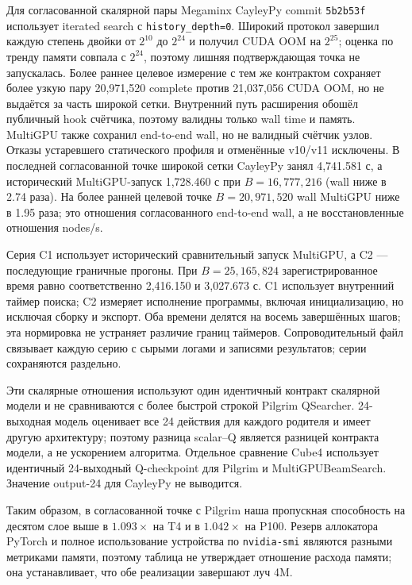 \documentclass[10pt,twocolumn]{article}
\begin{document}
Для согласованной скалярной пары Megaminx CayleyPy commit \texttt{5b2b53f}
использует iterated search с \texttt{history\_depth=0}. Широкий протокол
завершил каждую степень двойки от $2^{10}$ до $2^{24}$ и получил CUDA OOM на
$2^{25}$; оценка по тренду памяти совпала с $2^{24}$, поэтому лишняя
подтверждающая точка не запускалась. Более раннее целевое измерение с тем же
контрактом сохраняет более узкую пару 20,971,520 complete против 21,037,056
CUDA OOM, но не выдаётся за часть широкой сетки. Внутренний путь
расширения обошёл публичный hook счётчика, поэтому валидны только wall time и
память. MultiGPU также сохранил end-to-end wall, но не валидный счётчик узлов.
Отказы устаревшего статического профиля и отменённые v10/v11 исключены. В
последней согласованной
точке широкой сетки CayleyPy занял 4,741.581 с, а исторический MultiGPU-запуск
1,728.460 с при $B=16{,}777{,}216$ (wall ниже в 2.74 раза). На более ранней
целевой точке $B=20{,}971{,}520$ wall MultiGPU ниже в 1.95 раза; это отношения
согласованного end-to-end wall, а не восстановленные отношения nodes/s.

Серия C1 использует исторический сравнительный запуск MultiGPU, а C2 ---
последующие граничные прогоны. При $B=25{,}165{,}824$ зарегистрированное время равно
соответственно 2,416.150 и 3,027.673 с. C1 использует внутренний таймер поиска;
C2 измеряет исполнение программы, включая инициализацию, но исключая сборку и экспорт.
Оба времени делятся на восемь завершённых шагов; эта нормировка не устраняет различие границ таймеров.
Сопроводительный файл
 связывает каждую серию с сырыми логами
и записями результатов; серии сохраняются раздельно.

Эти скалярные отношения используют один идентичный контракт скалярной модели и
не сравниваются с более быстрой строкой Pilgrim QSearcher. 24-выходная модель
оценивает все 24 действия для каждого родителя и имеет другую архитектуру;
поэтому разница scalar--Q является разницей контракта модели, а не ускорением
алгоритма. Отдельное сравнение Cube4 использует идентичный 24-выходный
Q-checkpoint для Pilgrim и MultiGPUBeamSearch. Значение output-24 для CayleyPy
не выводится.

Таким образом, в согласованной
точке с Pilgrim наша пропускная способность на
десятом слое выше в $1.093\times$ на T4 и в $1.042\times$ на P100. Резерв
аллокатора PyTorch и полное использование устройства по \texttt{nvidia-smi}
являются разными метриками памяти, поэтому таблица не утверждает отношение
расхода памяти; она устанавливает, что обе реализации завершают луч 4M.
\end{document}
